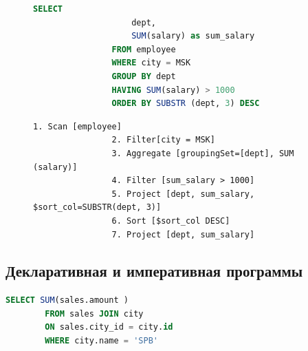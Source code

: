 \documentclass[11pt]{article}
\begin{document}
    \begin{figure}[!h]
        \begin{minipage}{0.4\textwidth}
            \begin{lstlisting}[language=SQL,caption={Сложный запрос}]
                SELECT
                    dept,
                    SUM(salary) as sum_salary
                FROM employee
                WHERE city = MSK
                GROUP BY dept
                HAVING SUM(salary) > 1000
                ORDER BY SUBSTR (dept, 3) DESC
            \end{lstlisting}
        \end{minipage}
        \begin{minipage}{0.5\textwidth}
            \begin{lstlisting}[caption = {Реляционные операторы}]
                1. Scan [employee]
                2. Filter[city = MSK]
                3. Aggregate [groupingSet=[dept], SUM (salary)]
                4. Filter [sum_salary > 1000]
                5. Project [dept, sum_salary, $sort_col=SUBSTR(dept, 3)]
                6. Sort [$sort_col DESC]
                7. Project [dept, sum_salary]
            \end{lstlisting}
        \end{minipage}
    \end{figure}

    \newpage

    \subsection{Декларативная и императивная программы}

    \begin{lstlisting}[language=SQL]
        SELECT SUM(sales.amount )
        FROM sales JOIN city
        ON sales.city_id = city.id
        WHERE city.name = 'SPB'
    \end{lstlisting}
\end{document}
